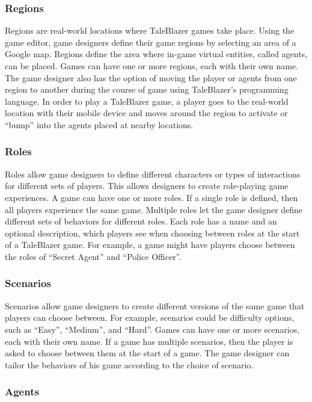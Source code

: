 \subsubsection{Regions}

Regions are real-world locations where TaleBlazer games take place. Using the game editor, game designers define their game regions by selecting an area of a Google map. Regions define the area where in-game virtual entities, called agents, can be placed. Games can have one or more regions, each with their own name. The game designer also has the option of moving the player or agents from one region to another during the course of game using TaleBlazer's programming language. In order to play a TaleBlazer game, a player goes to the real-world location with their mobile device and moves around the region to activate or ``bump'' into the agents placed at nearby locations. 

\subsubsection{Roles}

Roles allow game designers to define different characters or types of interactions for different sets of players. This allows designers to create role-playing game experiences. A game can have one or more roles. If a single role is defined, then all players experience the same game. Multiple roles let the game designer define different sets of behaviors for different roles. Each role has a name and an optional description, which players see when choosing between roles at the start of a TaleBlazer game. For example, a game might have players choose between the roles of ``Secret Agent'' and ``Police Officer''.

\subsubsection{Scenarios}

Scenarios allow game designers to create different versions of the same game that players can choose between. For example, scenarios could be difficulty options, such as ``Easy'', ``Medium'', and ``Hard''. Games can have one or more scenarios, each with their own name. If a game has multiple scenarios, then the player is asked to choose between them at the start of a game. The game designer can tailor the behaviors of his game according to the choice of scenario. 

\subsubsection{Agents}

